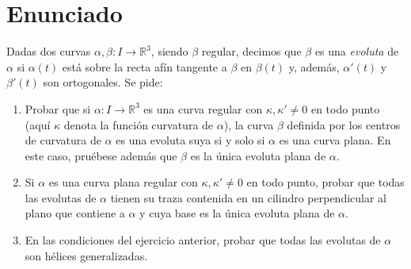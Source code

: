\section{Enunciado}
Dadas dos curvas $\alpha, \beta: I \rightarrow \mathbb{R}^3$, siendo $\beta$
regular, decimos que $\beta$ es una \textit{evoluta} de $\alpha$ si
$\alpha\left( t \right)$ está sobre la recta afín tangente a $\beta$ en
$\beta\left( t \right)$ y, además, $\alpha'\left( t \right)$ y $\beta'\left( t
\right)$ son ortogonales. Se pide:
\begin{enumerate}
    \item Probar que si $\alpha: I \rightarrow \mathbb{R}^3$ es una curva
        regular con $\kappa, \kappa' \neq 0$ en todo punto (aquí $\kappa$ denota
        la función curvatura de $\alpha$), la curva $\beta$ definida por los
        centros de curvatura de $\alpha$ es una evoluta suya si y solo si
        $\alpha$ es una curva plana. En este caso, pruébese además que $\beta$
        es la única evoluta plana de $\alpha$.

    \item Si $\alpha$ es una curva plana regular con $\kappa, \kappa' \neq 0$ en
        todo punto, probar que todas las evolutas de $\alpha$ tienen su traza
        contenida en un cilindro perpendicular al plano que contiene a $\alpha$
        y cuya base es la única evoluta plana de $\alpha$.

    \item En las condiciones del ejercicio anterior, probar que todas las
        evolutas de $\alpha$ son hélices generalizadas.
\end{enumerate}
